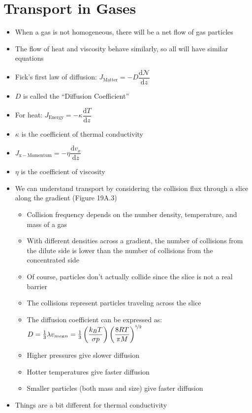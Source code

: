 \documentclass[12pt, openany, letterpaper]{memoir}
\begin{document}
\section{Transport in Gases}
\begin{itemize}
	\item When a gas is not homogeneous, there will be a net flow of gas particles
	\item The flow of heat and viscosity behave similarly, so all will have similar equations
	\item Fick's first law of diffusion: $J_{\mathrm{Matter}}=-D\dfrac{\mathrm{d}\mathcal{N}}{\mathrm{d}z}$
	\item $D$ is called the “Diffusion Coefficient”
	\item For heat: $J_{\mathrm{Energy}} = -\kappa\dfrac{\mathrm{d}T}{\mathrm{d}z}$
	\item $\kappa$ is the coefficient of thermal conductivity
	\item $J_{\mathrm{x-Momentum}} = -\eta\dfrac{\mathrm{d}v_x}{\mathrm{d}z}$
	\item $\eta$ is the coefficient of viscosity
	\item We can understand transport by considering the collision flux through a slice along the gradient (Figure 19A.3)
	      \begin{itemize}
		      \item Collision frequency depends on the number density, temperature, and mass of a gas
		      \item With different densities across a gradient, the number of collisions from the dilute side is lower than the number of collisions from the concentrated side
		      \item Of course, particles don't actually collide since the slice is not a real barrier
		      \item The collisions represent particles traveling across the slice
		      \item The diffusion coefficient can be expressed as: $D=\frac{1}{3}\lambda v_{mean}=\frac{1}{3}\left(\dfrac{k_BT}{\sigma p}\right)\left(\dfrac{8RT}{\pi M}\right)^{\nicefrac{1}{2}}$
		      \item Higher pressures give slower diffusion
		      \item Hotter temperatures give faster diffusion
		      \item Smaller particles (both mass and size) give faster diffusion
	      \end{itemize}
	\item Things are a bit different for thermal conductivity

\end{itemize}
\end{document}
